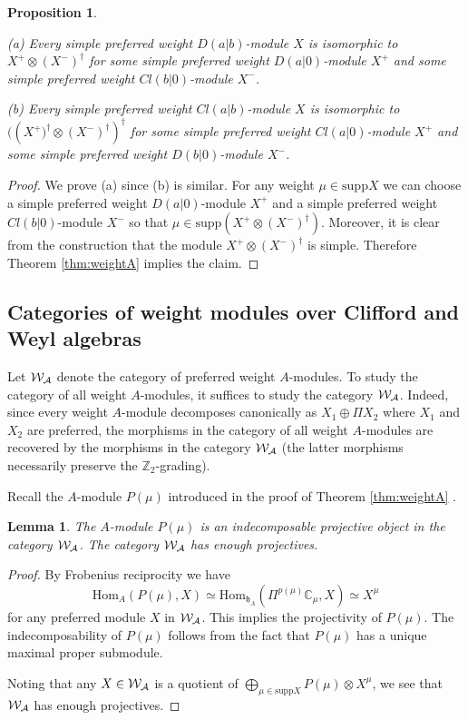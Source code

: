 \documentclass[12pt]{amsart}
\makeatletter
\def\mathcal{\cal}
\def\@putname#1#2#3#4{\def\@@ref{#3}\let\old@bf\bf
        \def\bf##1{\old@bf\if?\noexpand##1?{#4}\else##1\fi}%
	#1{#2}%
        \let\bf\old@bf}
\def\@putname#1#2#3#4{\def\@@ref{#3}\let\old@bf\bf	%
	\let\old@reset@font\reset@font			%
        \def\bf##1{\old@bf\if?\noexpand##1?{#4}\else##1\fi}%
	\def\reset@font##1##2{\old@reset@font##1\if?\noexpand##2?{#4}\else##2\fi}#1{#2}%
        \let\bf\old@bf\let\reset@font\old@reset@font}
\let\my@ref=\ref
\def\ref#1{\@putname\my@ref{#1}{#1}{\tiny\rm\@@ref}}
\theoremstyle{plain} %
\numberwithin{equation}{section}
\theoremstyle{definition}
\theoremstyle{remark}
\theoremstyle{plain} %
\newtheorem{lemma}[definition]{Lemma}
\newtheorem{proposition}[definition]{Proposition}
\newcommand{\cW}{\mathcal{W}}
\newcommand{\CC}{\mathbb{C}}
\newcommand{\Hom}{\mathrm{Hom}}
\newcommand{\supp}{\mathrm{supp}}
\newcommand{\gh}{\mathfrak{h}}
\def\gh{\mathfrak{h}}
\makeatother
\begin{document}
          \begin{proposition}\label{description-of-simple}

   (a)         Every simple preferred weight $D(a|b)$-module $X$ is isomorphic to $X^+\otimes (X^-)^\dagger$  for some simple preferred weight $D(a|0)$-module $X^+$ and some simple preferred weight $Cl(b|0)$-module $X^-$.
 

   (b) Every simple preferred weight $Cl(a|b)$-module $X$  is isomorphic to $(\left(X^+)^\dagger\otimes (X^-)^\dagger \right)^{\dagger}$  for some simple preferred weight $Cl(a|0)$-module $X^+$ and some
   simple preferred weight $D(b|0)$-module $X^-$.
   
 \end{proposition}
 \begin{proof} We prove (a) since (b) is similar. For any weight  $\mu\in\supp X$ we can choose  a simple preferred weight $D(a|0)$-module $X^+$  and a simple preferred weight $Cl(b|0)$-module $X^-$ so that $\mu\in \supp \left( X^+\otimes (X^-)^\dagger \right)$.  Moreover, it is clear from the construction that the module $X^+\otimes (X^-)^\dagger$ is simple.
 Therefore  Theorem \ref{thm:weightA} implies the claim.     \end{proof}
     

    
    \subsection{Categories of weight modules over Clifford and  Weyl   algebras}

      
    Let $\cW_{A}$ denote the category of preferred weight $A$-modules. To study the category  of all weight $A$-modules, it suffices to study
    the category  $\cW_{A}$. Indeed,  since every weight $A$-module decomposes canonically as $X_1 \oplus \Pi X_2$ where $X_1$ and $X_2$ are preferred,  the morphisms in the category of all weight $A$-modules are recovered by the morphisms in the category $\cW_{A}$ (the latter morphisms necessarily preserve the $\mathbb Z_2$-grading).

  Recall the $A$-module $P(\mu)$ introduced in  the proof of Theorem \ref{thm:weightA}.

  \begin{lemma}\label{pims} The $A$-module $P(\mu)$ is an indecomposable projective object in the category $\mathcal W_A$.
   The category  $\mathcal W_A$ has enough projectives.    
  \end{lemma}
  \begin{proof} By Frobenius reciprocity we have
    $$\Hom_A(P(\mu),X)\simeq\Hom_{\gh_A}(\Pi^{p(\mu)}\CC_\mu,X)\simeq X^\mu$$
for any preferred module $X$ in $\mathcal W_A$.     This implies the projectivity of $P(\mu)$. The indecomposability of  $P(\mu)$ follows from the fact that $P(\mu)$ has a unique maximal proper submodule.

    
   
    Noting that any $X\in \cW_{A}$ is a quotient of $\bigoplus_{\mu\in\supp X}P(\mu)\otimes X^\mu$, we see that  $\mathcal W_A$ has enough projectives.

  
    \end{proof}
      
\end{document}
